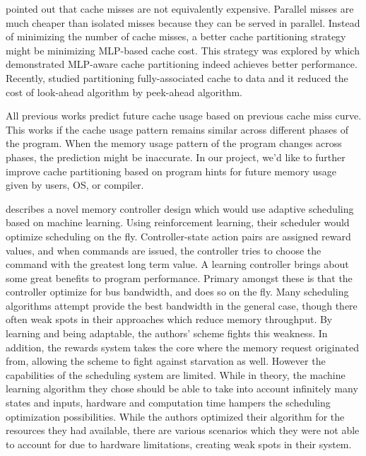 \documentclass{acm_proc_article-sp}
\begin{document}
\cite{Qureshi:2006:CMC:1150019.1136501} pointed out that cache misses are not 
equivalently expensive. Parallel misses are much cheaper than isolated misses 
because they can be served in parallel. Instead of minimizing the number of 
cache misses, a better cache partitioning strategy might be minimizing MLP-based
cache cost. This strategy was explored by \cite{conf/IEEEpact/MoretoCRV07} which
demonstrated MLP-aware cache partitioning indeed achieves better performance.
Recently, \cite{conf/IEEEpact/BeckmannS13} studied partitioning fully-associated
cache to data and it reduced the cost of look-ahead algorithm by peek-ahead 
algorithm.

All previous works predict future cache usage based on previous cache miss 
curve. This works if the cache usage pattern remains similar across different 
phases of the program. When the memory usage pattern of the program changes 
across phases, the prediction might be inaccurate. In our project, we'd like to
further improve cache partitioning based on program hints for future memory 
usage given by users, OS, or compiler.

\cite{Ipek:2008:SMC:1381306.1382172} describes a novel memory controller design
 which would use adaptive 
scheduling based on machine learning. Using reinforcement learning, their 
scheduler would optimize scheduling on the fly. Controller-state action pairs 
are assigned reward values, and when commands are issued, the controller tries 
to choose the command with the greatest long term value. A learning controller 
brings about some great benefits to program performance. Primary amongst these 
is that the controller optimize for bus bandwidth, and does so on the fly. Many 
scheduling algorithms attempt provide the best bandwidth in the general case, 
though there often weak spots in their approaches which reduce memory 
throughput. By learning and being adaptable, the authors' scheme fights this 
weakness. In addition, the rewards system takes the core where the memory 
request originated from, allowing the scheme to fight against starvation as 
well. However the capabilities of the scheduling system are limited. While in 
theory, the machine learning algorithm they chose should be able to take into 
account infinitely many states and inputs, hardware and computation time hampers
 the scheduling optimization possibilities. While the authors optimized their 
algorithm for the resources they had available, there are various scenarios 
which they were not able to account for due to hardware limitations, creating 
weak spots in their system.
\end{document}
